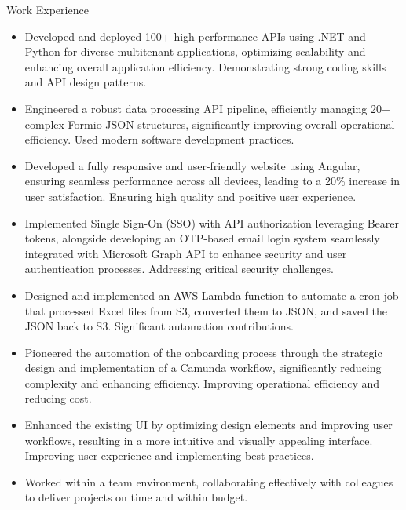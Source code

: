 \documentclass{resume}
\begin{document}
\begin{experienceSection}{Work Experience}
    \experienceItem[
        company={EXL Digital},
        location={Noida Sec-144},
        position={FullStack Developer},
        duration={Aug 2023 -- Present}
    ]
    \begin{itemize}
        \itemsep -6pt
        \item Developed and deployed 100+ high-performance APIs using .NET and Python for diverse multitenant applications, optimizing scalability and enhancing overall application efficiency.  Demonstrating strong coding skills and API design patterns.
        \item Engineered a robust data processing API pipeline, efficiently managing 20+ complex Formio JSON structures, significantly improving overall operational efficiency.  Used modern software development practices.
        \item Developed a fully responsive and user-friendly website using Angular, ensuring seamless performance across all devices, leading to a 20\% increase in user satisfaction.  Ensuring high quality and positive user experience.
        \item Implemented Single Sign-On (SSO) with API authorization leveraging Bearer tokens, alongside developing an OTP-based email login system seamlessly integrated with Microsoft Graph API to enhance security and user authentication processes.  Addressing critical security challenges.
        \item Designed and implemented an AWS Lambda function to automate a cron job that processed Excel files from S3, converted them to JSON, and saved the JSON back to S3.  Significant automation contributions.
        \item Pioneered the automation of the onboarding process through the strategic design and implementation of a Camunda workflow, significantly reducing complexity and enhancing efficiency.  Improving operational efficiency and reducing cost.
    \end{itemize}
    \experienceItem[
        company={Nokia},
        location={Chennai},
        position={Web Developer Intern},
        duration={Jun 2018 -- Jul 2018}
    ]
    \begin{itemize}
        \itemsep -6pt
        \item Enhanced the existing UI by optimizing design elements and improving user workflows, resulting in a more intuitive and visually appealing interface.  Improving user experience and implementing best practices.
        \item Worked within a team environment, collaborating effectively with colleagues to deliver projects on time and within budget.
    \end{itemize}
\end{experienceSection}
\end{document}

